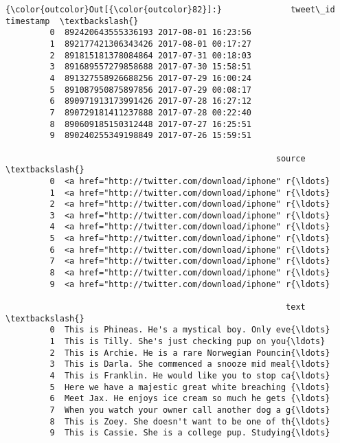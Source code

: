 \documentclass[11pt]{article}
\begin{document}
\begin{Verbatim}[commandchars=\\\{\}]
{\color{outcolor}Out[{\color{outcolor}82}]:}              tweet\_id           timestamp  \textbackslash{}
         0  892420643555336193 2017-08-01 16:23:56   
         1  892177421306343426 2017-08-01 00:17:27   
         2  891815181378084864 2017-07-31 00:18:03   
         3  891689557279858688 2017-07-30 15:58:51   
         4  891327558926688256 2017-07-29 16:00:24   
         5  891087950875897856 2017-07-29 00:08:17   
         6  890971913173991426 2017-07-28 16:27:12   
         7  890729181411237888 2017-07-28 00:22:40   
         8  890609185150312448 2017-07-27 16:25:51   
         9  890240255349198849 2017-07-26 15:59:51   
         
                                                       source  \textbackslash{}
         0  <a href="http://twitter.com/download/iphone" r{\ldots}   
         1  <a href="http://twitter.com/download/iphone" r{\ldots}   
         2  <a href="http://twitter.com/download/iphone" r{\ldots}   
         3  <a href="http://twitter.com/download/iphone" r{\ldots}   
         4  <a href="http://twitter.com/download/iphone" r{\ldots}   
         5  <a href="http://twitter.com/download/iphone" r{\ldots}   
         6  <a href="http://twitter.com/download/iphone" r{\ldots}   
         7  <a href="http://twitter.com/download/iphone" r{\ldots}   
         8  <a href="http://twitter.com/download/iphone" r{\ldots}   
         9  <a href="http://twitter.com/download/iphone" r{\ldots}   
         
                                                         text  \textbackslash{}
         0  This is Phineas. He's a mystical boy. Only eve{\ldots}   
         1  This is Tilly. She's just checking pup on you{\ldots}   
         2  This is Archie. He is a rare Norwegian Pouncin{\ldots}   
         3  This is Darla. She commenced a snooze mid meal{\ldots}   
         4  This is Franklin. He would like you to stop ca{\ldots}   
         5  Here we have a majestic great white breaching {\ldots}   
         6  Meet Jax. He enjoys ice cream so much he gets {\ldots}   
         7  When you watch your owner call another dog a g{\ldots}   
         8  This is Zoey. She doesn't want to be one of th{\ldots}   
         9  This is Cassie. She is a college pup. Studying{\ldots}   
         

\end{Verbatim}
\end{document}
